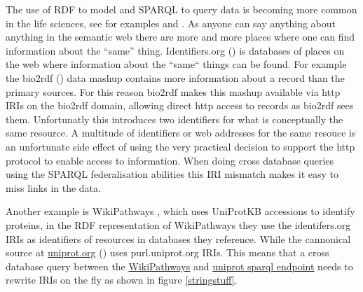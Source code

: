 \documentclass{bioinfo}
\begin{document}
The use of RDF to model and SPARQL to query data is becoming more common in the life sciences, see for examples \cite{Jupp01052014} and \cite{BioHack2011and2012}.
As anyone can say anything about anything in the semantic web there are more and more places where one can find information about the ``same'' thing.
Identifiers.org (\cite{Juty01012012}) is databases of places on the web where information about the ``same`` things can be found.
For example the bio2rdf (\cite{Belleau2008706}) data mashup contains more information about a record than the primary sources.
For this reason bio2rdf makes this mashup available via http IRIs on the bio2rdf domain, allowing direct http access to records as bio2rdf sees them.
Unfortunatly this introduces two identifiers for what is conceptually the same resource.
A multitude of identifiers or web addresses for the same resouce is an unfortunate side effect of using the very practical decision to support the http protocol to enable access to information.
When doing cross database queries using the SPARQL federalisation abilities this IRI mismatch makes it easy to miss links in the data.

Another example is WikiPathways \cite{Kelder16112011}, which uses UniProtKB accessions to identify proteins, in the RDF representation of WikiPathways they use the
identifers.org IRIs as identifiers of resources in databases they reference.
While the cannonical source at \href{http://www.uniprot.org}{uniprot.org} (\cite{UniProt2013}) uses purl.uniprot.org IRIs.
This means that a cross database query between the \href{http://sparql.wikipathways.org/}{WikiPathways}  and \href{http://beta.sparql.uniprot.org/sparql}{uniprot sparql endpoint} needs to rewrite IRIs on the fly as shown in figure \ref{stringstuff}.
\end{document}
